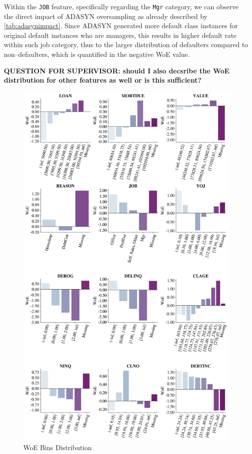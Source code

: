 Within the \texttt{JOB} feature, specifically regarding the \texttt{Mgr} category, we can observe the direct impact of ADASYN oversampling as already described by \autoref{tab:adasynimpact}.
Since ADASYN generated more default class instances for original default instances who are managers, this results in higher default rate within such job category, thus to the larger distribution of defaulters compared to non--defaulters, which is quantified in the negative WoE value.

\textbf{QUESTION FOR SUPERVISOR: should I also decsribe the WoE distribution for other features as well or is this sufficient?}


\begin{figure}[H]
\centering
\caption{WoE Bins Distribution}\vspace{0.5em}
\label{fig:woedist}
\includegraphics[width=140mm]{Figures/WoE_Distribution.jpg}
\vspace{-1em}
\end{figure}

